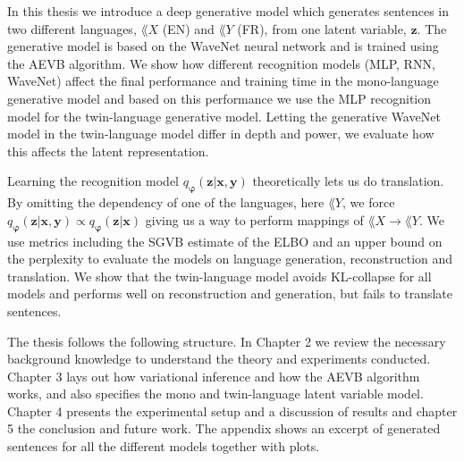 
In this thesis we introduce a deep generative model which generates sentences in two
different languages, $\lang{X}$ (EN) and $\lang{Y}$ (FR), from one latent
variable, $\bm{z}$. The generative model is based on the WaveNet neural network
\cite{DBLP:journals/corr/OordDZSVGKSK16} and is trained using the AEVB
algorithm. We show how different recognition models (MLP, RNN, WaveNet) affect
the final performance and training time in the mono-language generative model and based on this
performance we use the MLP recognition model for the twin-language generative
model. Letting the generative WaveNet model in the twin-language model differ in
depth and power, we evaluate how this affects the latent representation.

Learning the recognition model $q_{\bm{\varphi}}(\bm{z} | \bm{x}, \bm{y})$
theoretically lets us do translation. By omitting the dependency of one of the
languages, here $\lang{Y}$, we force $q_{\bm{\varphi}}(\bm{z} | \bm{x}, \bm{y})
\propto q_{\bm{\varphi}}(\bm{z} | \bm{x})$ giving us a way to perform mappings of $\lang{X} \to
\lang{Y}$. We use metrics including the SGVB estimate of the ELBO
and an upper bound on the perplexity to evaluate the models on language
generation, reconstruction and translation. We show that the twin-language model
avoids KL-collapse for all models and performs well on reconstruction and
generation, but fails to translate sentences.


The thesis follows the following structure. In Chapter 2 we review the necessary
background knowledge to understand the theory and experiments conducted. Chapter
3 lays out how variational inference and how the AEVB algorithm works,
and also specifies the mono and twin-language latent variable model. Chapter 4 presents the
experimental setup and a discussion of results and chapter 5 the conclusion and future work. The
appendix shows an excerpt of generated sentences for all the different models
together with plots.
